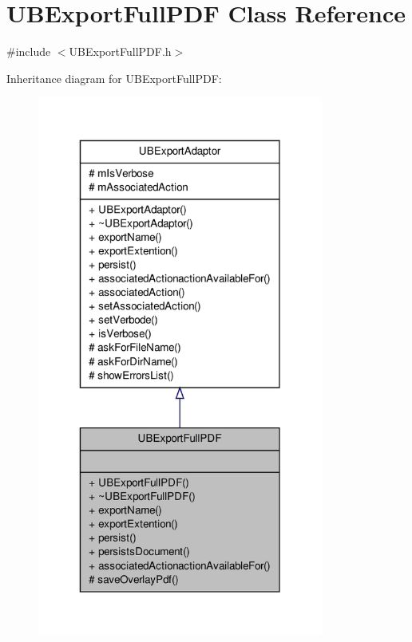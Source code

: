 \hypertarget{class_u_b_export_full_p_d_f}{\section{U\-B\-Export\-Full\-P\-D\-F Class Reference}
\label{d6/d54/class_u_b_export_full_p_d_f}
}


{\ttfamily \#include $<$U\-B\-Export\-Full\-P\-D\-F.\-h$>$}



Inheritance diagram for U\-B\-Export\-Full\-P\-D\-F\-:
\nopagebreak
\begin{figure}[H]
\begin{center}
\leavevmode
\includegraphics[width=266pt]{d5/d95/class_u_b_export_full_p_d_f__inherit__graph}
\end{center}
\end{figure}


